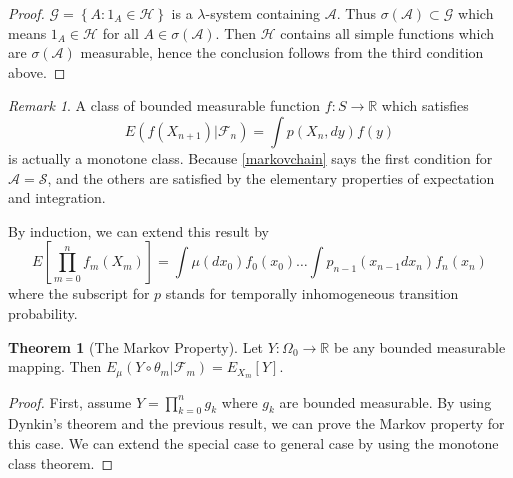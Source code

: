 \documentclass{memoir}
\theoremstyle{definition}
\newtheorem{theorem}[definition]{Theorem}
\theoremstyle{remark}
\newtheorem*{remark}{Remark}
\begin{document}
\begin{proof}
	$\mathcal{G} = \left\{ A:1_A \in \mathcal{H} \right\}$ is a $\lambda$-system containing $\mathcal{A}$.
	Thus $\sigma(\mathcal{A}) \subset \mathcal{G}$ which means $1_A \in \mathcal{H}$ for all $A \in \sigma(\mathcal{A})$.
	Then $\mathcal{H}$ contains all simple functions which are $\sigma(\mathcal{A})$ measurable, hence the conclusion follows from the third condition above.
\end{proof}

\begin{remark}
	A class of bounded measurable function $f:S \rightarrow \mathbb{R}$ which satisfies
	\[
		E\left( f(X_{n+1}) \lvert \mathcal{F}_n \right) = \int p(X_n, dy)f(y)
	\]
	is actually a monotone class. 
	Because \ref{markovchain} says the first condition for $\mathcal{A} = \mathcal{S}$,
	and the others are satisfied by the elementary properties of expectation and integration.

	By induction, we can extend this result by
	\[
		E\left[ \prod_{m=0}^n f_m(X_m) \right] = \int\mu(dx_0)f_0(x_0) \dots \int p_{n-1}(x_{n-1}dx_n)f_n(x_n)
	\]
	where the subscript for $p$ stands for temporally inhomogeneous transition probability.
	\label{<+label+>}
\end{remark}

\begin{theorem}[The Markov Property]
	Let $Y: \Omega_0 \rightarrow \mathbb{R}$ be any bounded measurable mapping.
	Then $E_\mu \left (Y \circ \theta_m \lvert \mathcal{F}_m \right ) = E_{X_m}\left[ Y \right].$
	\label{markovproperty}
\end{theorem}

\begin{proof}
	First, assume $Y = \prod_{k=0}^n g_k$ where $g_k$ are bounded measurable.
	By using Dynkin's theorem and the previous result, we can prove the Markov property for this case.
	We can extend the special case to general case by using the monotone class theorem.
\end{proof}
\end{document}
